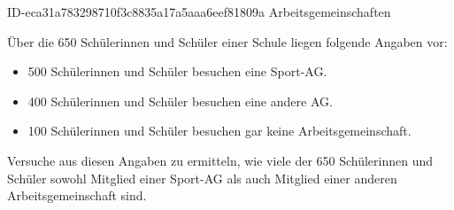 \begin{exercise}
      {ID-eca31a783298710f3c8835a17a5aaa6eef81809a}
      {Arbeitsgemeinschaften}
  \ifproblem\problem\par
    Über die 650 Schülerinnen und Schüler einer Schule liegen folgende Angaben
    vor:
    \begin{itemize}
      \squeeze
      \item 500 Schülerinnen und Schüler besuchen eine Sport-AG.
      \item 400 Schülerinnen und Schüler besuchen eine andere AG.
      \item 100 Schülerinnen und Schüler besuchen gar keine Arbeitsgemeinschaft.
    \end{itemize}
    Versuche aus diesen Angaben zu ermitteln, wie viele der 650 Schülerinnen
    und Schüler sowohl Mitglied einer Sport-AG als auch Mitglied einer anderen
    Arbeitsgemeinschaft sind.
  \fi
\end{exercise}
